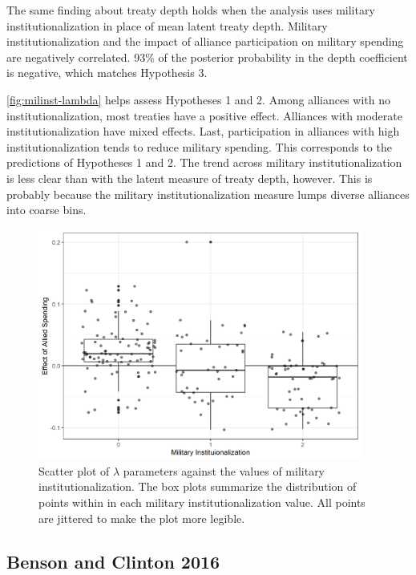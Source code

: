 \documentclass[12pt]{article}
\begin{document}
The same finding about treaty depth holds when the analysis uses military institutionalization in place of mean latent treaty depth. 
Military institutionalization and the impact of alliance participation on military spending are negatively correlated. 
93\% of the posterior probability in the depth coefficient is negative, which matches Hypothesis 3. 


\autoref{fig:milinst-lambda} helps assess Hypotheses 1 and 2. 
Among alliances with no institutionalization, most treaties have a positive effect. 
Alliances with moderate institutionalization have mixed effects. 
Last, participation in alliances with high institutionalization tends to reduce military spending. 
This corresponds to the predictions of Hypotheses 1 and 2. 
The trend across military institutionalization is less clear than with the latent measure of treaty depth, however.
This is probably because the military institutionalization measure lumps diverse alliances into coarse bins. 


\begin{figure}[htbp]
	\centering
		\includegraphics[width=0.95\textwidth]{milinst-lambda.png}
	\caption{Scatter plot of $\lambda$ parameters against the values of military institutionalization. The box plots summarize the distribution of points within in each military institutionalization value. All points are jittered to make the plot more legible.}
	\label{fig:milinst-lambda}
\end{figure}



\subsection{Benson and Clinton 2016}
\end{document}
